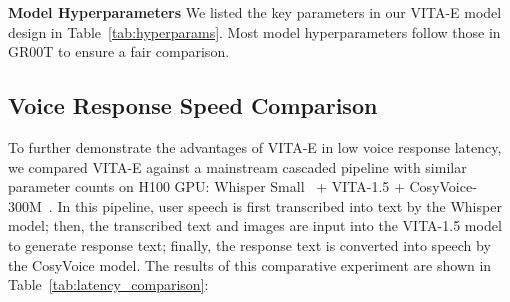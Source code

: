 \begin{table}[H]
\centering
\caption{VITA-E model hyperparameters.}
\end{table}

\textbf{Model Hyperparameters}
We listed the key parameters in our VITA-E model design in Table~\ref{tab:hyperparams}. Most model hyperparameters follow those in GR00T to ensure a fair comparison.

\subsection{Voice Response Speed Comparison}

To further demonstrate the advantages of VITA-E in low voice response latency, we compared VITA-E against a mainstream cascaded pipeline with similar parameter counts on H100 GPU: Whisper Small~\citep{Radford2022RobustSR} + VITA-1.5 + CosyVoice-300M~\citep{Du2024CosyVoiceAS}. In this pipeline, user speech is first transcribed into text by the Whisper model; then, the transcribed text and images are input into the VITA-1.5 model to generate response text; finally, the response text is converted into speech by the CosyVoice model. The results of this comparative experiment are shown in Table~\ref{tab:latency_comparison}:


